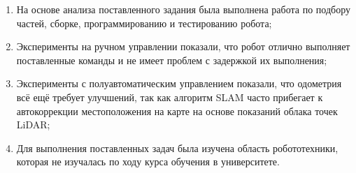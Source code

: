 \begin{enumerate}
  \item На основе анализа поставленного задания была выполнена работа по подбору частей, сборке, программированию и тестированию робота;
  \item Эксперименты на ручном управлении показали, что робот отлично выполняет поставленные команды и не имеет проблем с задержкой их выполнения;
  \item Эксперименты с полуавтоматическим управлением показали, что одометрия всё ещё требует улучшений, так как алгоритм SLAM часто прибегает к автокоррекции местоположения на карте на основе показаний облака точек LiDAR;
  \item Для выполнения поставленных задач была изучена область робототехники, которая не изучалась по ходу курса обучения в университете. 
\end{enumerate}
